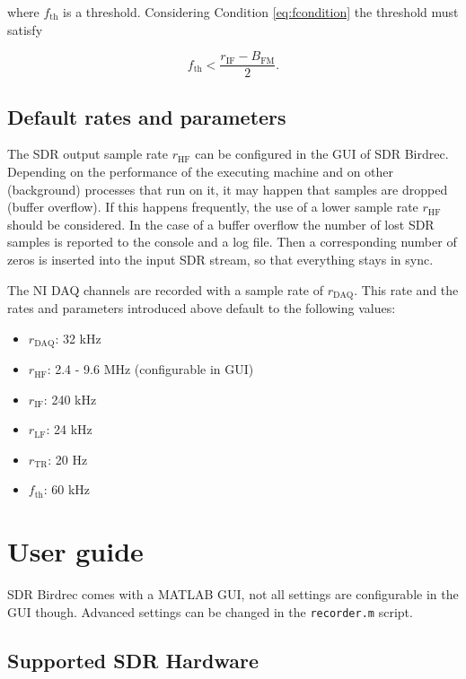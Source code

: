 \documentclass[10pt]{article}
\begin{document}
where $f_\text{th}$ is a threshold. Considering Condition \ref{eq:fcondition} the threshold must satisfy

\begin{equation}
f_\text{th} < \frac{r_\text{IF} - B_\text{FM}}{2} \text{.}
\end{equation}

\subsection{Default rates and parameters}
The SDR output sample rate $r_\text{HF}$ can be configured in the GUI of SDR Birdrec. Depending on the performance of the executing machine and on other (background) processes that run on it, it may happen that samples are dropped (buffer overflow). If this happens frequently, the use of a lower sample rate $r_\text{HF}$ should be considered. In the case of a buffer overflow the number of lost SDR samples is reported to the console and a log file. Then a corresponding number of zeros is inserted into the input SDR stream, so that everything stays in sync.

The NI DAQ channels are recorded with a sample rate of $r_\text{DAQ}$. This rate and the rates and parameters introduced above default to the following values:

\begin{itemize}
\item $r_\text{DAQ}$: 32 kHz
\item $r_\text{HF}$: 2.4 - 9.6 MHz (configurable in GUI)
\item $r_\text{IF}$: 240 kHz
\item $r_\text{LF}$: 24 kHz
\item $r_\text{TR}$: 20 Hz
\item $f_\text{th}$: 60 kHz
\end{itemize}




\section{User guide}\label{user-guide}

SDR Birdrec comes with a MATLAB GUI, not all settings are configurable
in the GUI though. Advanced settings can be changed in the
\texttt{recorder.m} script.

\subsection{Supported SDR Hardware}\label{supported-sdr-hardware}
\end{document}
